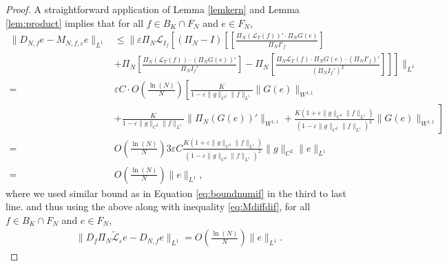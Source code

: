 \documentclass[12pt]{article}
\def\L{\mathcal{L}}
\newcommand{\eps}{\varepsilon}
\theoremstyle{plain}
\begin{document}
{{\begin{proof}
A straightforward application of Lemma \ref{lemkern} and Lemma \ref{lem:product} implies that for all $f\in B_K\cap F_N$ and $e\in F_N$, 
\begin{align*}
    \|D_{N,f}e- M_{N,f,\eps}e\|_{L^1}&\leq \|\eps \Pi_N\L_{I_f}\left[(\Pi_N-I)\left[\left[\frac{\Pi_N(\L_{T}(f))' \cdot \Pi_NG(e)}{\Pi_N I'_f}\right]\right.\right.\\
    &\left.\left.+ \Pi_N\left[\frac{\Pi_N(\L_{T}(f))\cdot (\Pi_NG(e))'}{\Pi_N I_{f}'}\right] - \Pi_N\left[\frac{\Pi_N\L_{T}(f)\cdot \Pi_NG(e)\cdot (\Pi_N I'_f)'}{(\Pi_N I_{f}')^2}\right]\right]\right]\|_{L^1}\\
    =&\eps C \cdot O\left(\frac{\ln(N)}{N}\right) \left[ \frac{K}{1-\eps\|g\|_{C^2}\|f\|_{L^1}}\|G(e)\|_{W^{1,1}}\right.\\
    &\left.+ \frac{K}{1-\eps\|g\|_{C^2}\|f\|_{L^1}}\|\Pi_N(G(e))'\|_{W^{1,1}}+\frac{K(1+\eps\|g\|_{C^3}\|f\|_{L^1})}{(1-\eps\|g\|_{C^2}\|f\|_{L^1})^2}\|G(e)\|_{W^{1,1}}\right]\\
    = &O\left(\frac{\ln(N)}{N}\right)3\eps C \frac{K(1+\eps\|g\|_{C^3}\|f\|_{L^1})}{(1-\eps\|g\|_{C^2}\|f\|_{L^1})^2}\|g\|_{C^2}\|e\|_{L^1}\\
    =&O\left(\frac{\ln(N)}{N}\right)\|e\|_{L^1},
\end{align*}
where we used similar bound as in Equation \eqref{eq:boundnumif} in the third to last line.
and thus using the above along with inequality \eqref{eq:Mdiffdif}, for all $f\in B_K\cap F_N$ and $e\in F_N$,
\begin{align*}
    \| D_f\Pi_N\tilde{\mathcal L}_\eps e-D_{N,f}e\|_{L^1}=O\left(\frac{\ln(N)}{N}\right)\|e\|_{L^1}.
\end{align*}



\end{proof}}}
\end{document}
